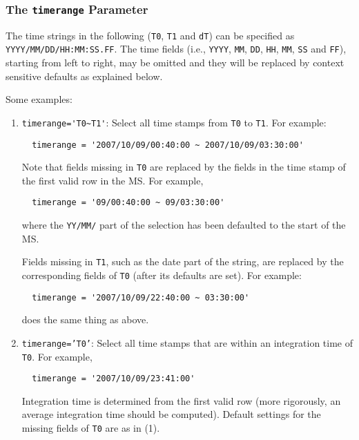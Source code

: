 \subsubsection{The {\tt timerange} Parameter}
\label{section:io.selection.selectdata.timerange}

The time strings in the following ({\tt T0}, {\tt T1} and {\tt dT}) 
can be specified as {\tt YYYY/MM/DD/HH:MM:SS.FF}.  
The time fields (i.e., {\tt YYYY}, {\tt MM}, {\tt DD}, {\tt HH}, 
{\tt MM}, {\tt SS} and {\tt FF}),
starting from left to right, may be omitted and they will be replaced
by context sensitive defaults as explained below.

Some examples:
\begin{enumerate}

\item {\verb!timerange='T0~T1'!}:   Select all time stamps from 
{\tt T0} to {\tt T1}.  For example:
\small
\begin{verbatim}
  timerange = '2007/10/09/00:40:00 ~ 2007/10/09/03:30:00'
\end{verbatim}
\normalsize

Note that fields missing in {\tt T0} are replaced by the fields in the
time stamp of the first valid row in the MS.  For example, 
\small
\begin{verbatim}
  timerange = '09/00:40:00 ~ 09/03:30:00'
\end{verbatim}
\normalsize
where the {\tt YY/MM/} part of the selection has been defaulted
to the start of the MS.  

Fields missing in {\tt T1}, such as
the date part of the string, are replaced by the corresponding fields
of {\tt T0} (after its defaults are set).  For example:
\small
\begin{verbatim}
  timerange = '2007/10/09/22:40:00 ~ 03:30:00'
\end{verbatim}
\normalsize
does the same thing as above.  

\item {\tt timerange='T0'}:  Select all time stamps that are within an
integration time of {\tt T0}.  For example,
\small
\begin{verbatim}
  timerange = '2007/10/09/23:41:00'
\end{verbatim}
\normalsize

Integration time is determined from the first valid row
(more rigorously, an average integration time should be computed).
Default settings for the missing fields of {\tt T0} are as in (1).


\end{enumerate}
